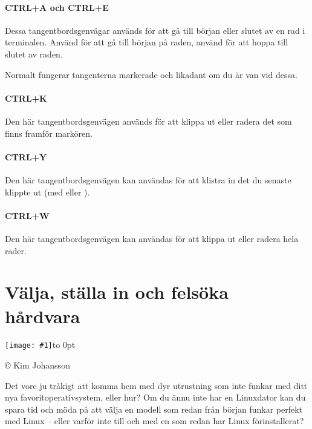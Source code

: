 \documentclass[a4paper,final]{memoir} %
\newcommand{\xrcredit}[1]{\hbox to 0pt{\hspace*{.6\baselineskip}\begin{rotate}{90}{\usefont{T1}{phv}{m}{n}\selectfont\tiny #1}\end{rotate}}}
\newcommand\xintropic[1]{{\texttt{[image: \#1]}\xrcredit{\copyright{} Kim Johansson}}\medskip}
\newcommand\xchapter[2]{\chapter{#2}\begin{center}\xintropic{#1}\end{center}}
\begin{document}
\subsubsection{CTRL+A och CTRL+E}

Dessa tangentbordsgenvägar används för att gå till början eller slutet av en rad i terminalen. Använd  för att gå till början på raden, använd  för att hoppa till slutet av raden.

Normalt fungerar tangenterna markerade  och  likadant om du är van vid dessa.

\subsubsection{CTRL+K}

Den här tangentbordsgenvägen används för att klippa ut eller radera det som finns framför markören.

\subsubsection{CTRL+Y}

Den här tangentbordsgenvägen kan användas för att klistra in det du senaste klippte ut (med  eller ).

\subsubsection{CTRL+W}

Den här tangentbordsgenvägen kan användas för att klippa ut eller radera hela rader.



\xchapter{bilder804-all/Valja_konfigurera_och_felsoka}{Välja, ställa in och felsöka hårdvara}\label{cha:hardvara}



Det vore ju tråkigt att komma hem med dyr utrustning som inte funkar med ditt nya favoritoperativsystem, eller hur? Om du ännu inte har en Linuxdator kan du spara tid och möda på att välja en modell som redan från början funkar perfekt med Linux -- eller varför inte till och med en som redan har Linux förinstallerat? 
\end{document}
